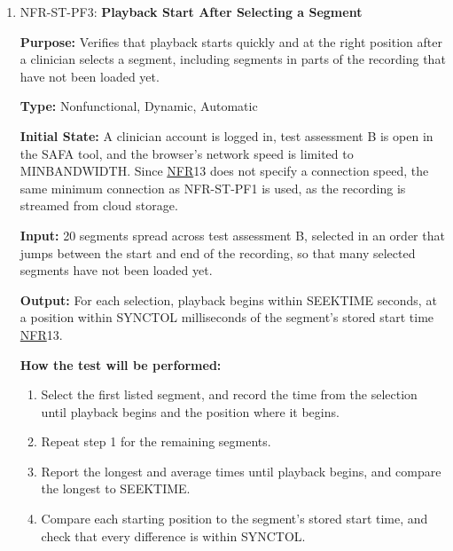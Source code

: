 \documentclass[12pt, titlepage]{article}
\newcommand{\srsnfr}[1]{\href{https://github.com/Nour-Fawaz/MacaBoca/blob/main/pdfs/SRS/SRS.pdf}{NFR}}
\renewcommand{\_}{\oldunderscore\allowbreak}
\begin{document}
\begin{enumerate}
  \item NFR-ST-PF3: \textbf{Playback Start After Selecting a Segment\\}
  \begin{mdframed}[linewidth=0.5mm]
      \textbf{Purpose:} Verifies that playback starts quickly and at the right position after a clinician selects a segment, including segments in parts of the recording that have not been loaded yet. \par
      \textbf{Type:} Nonfunctional, Dynamic, Automatic \par
      \textbf{Initial State:} A clinician account is logged in, test assessment B is open in the SAFA tool, and the browser's network speed is limited to MIN\_BANDWIDTH. Since \srsnfr*{13} does not specify a connection speed, the same minimum connection as NFR-ST-PF1 is used, as the recording is streamed from cloud storage. \par
      \textbf{Input:} 20 segments spread across test assessment B, selected in an order that jumps between the start and end of the recording, so that many selected segments have not been loaded yet. \par
      \textbf{Output:} For each selection, playback begins within SEEK\_TIME seconds, at a position within SYNC\_TOL milliseconds of the segment's stored start time \srsnfr*{13}. \par
      \textbf{How the test will be performed:}
      \begin{enumerate}
        \item[1.] Select the first listed segment, and record the time from the selection until playback begins and the position where it begins.
        \item[2.] Repeat step 1 for the remaining segments.
        \item[3.] Report the longest and average times until playback begins, and compare the longest to SEEK\_TIME.
        \item[4.] Compare each starting position to the segment's stored start time, and check that every difference is within SYNC\_TOL.
      \end{enumerate}
  \end{mdframed}
\end{enumerate}
\end{document}

